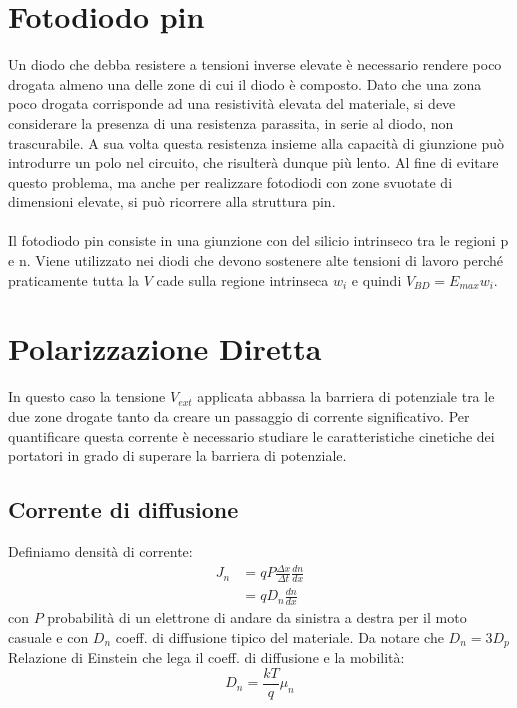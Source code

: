 \documentclass{article}
\begin{document}
\section*{Fotodiodo pin}
Un diodo che debba resistere a tensioni inverse elevate è necessario rendere poco drogata almeno una delle zone di cui il diodo è composto. Dato che una zona poco drogata corrisponde ad una resistività elevata del materiale, si deve considerare la presenza di una resistenza parassita, in serie al diodo, non trascurabile. A sua volta questa resistenza insieme alla capacità di giunzione può introdurre un polo nel circuito, che risulterà dunque più lento. Al fine di evitare questo problema, ma anche per realizzare fotodiodi con zone svuotate di dimensioni elevate, si può ricorrere alla struttura pin.\\
\\
Il fotodiodo pin consiste in una giunzione con del silicio intrinseco tra le regioni p e n. Viene utilizzato nei diodi che devono sostenere alte tensioni di lavoro perché praticamente tutta la $V$ cade sulla regione intrinseca $w_i$ e quindi $V_{BD} = E_{max} w_i$.

\section*{Polarizzazione Diretta}
In questo caso la tensione $V_{ext}$ applicata abbassa la barriera di potenziale tra le due zone drogate tanto da creare un passaggio di corrente significativo. Per quantificare questa corrente è necessario studiare le caratteristiche cinetiche dei portatori in grado di superare la barriera di potenziale.

\subsection*{Corrente di diffusione}
Definiamo densità di corrente:
\begin{align*}
J_n &= q P \frac{\Delta x}{\Delta t} \frac{dn}{dx}\\
&= qD_n \frac{dn}{dx}
\end{align*}
con $P$ probabilità di un elettrone di andare da sinistra a destra per il moto casuale e con $D_n$ coeff. di diffusione tipico del materiale. Da notare che $D_n = 3 D_p$
\\
Relazione di Einstein che lega il coeff. di diffusione e la mobilità:
\begin{equation*}
D_n = \frac{kT}{q} \mu_n
\end{equation*}
\end{document}
